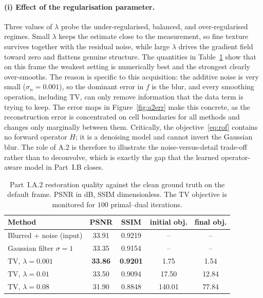 \documentclass[11pt,a4paper]{article}
\begin{document}
\paragraph{(i) Effect of the regularisation parameter.}
Three values of \(\lambda\) probe the under-regularised, balanced, and
over-regularised regimes. Small \(\lambda\) keeps the estimate close to the
measurement, so fine texture survives together with the residual noise, while
large \(\lambda\) drives the gradient field toward zero and flattens genuine
structure. The quantities in Table~\ref{tab:a2} show that on this frame the
weakest setting is numerically best and the strongest clearly over-smooths.
The reason is specific to this acquisition: the additive noise is very small
(\(\sigma_n=0.001\)), so the dominant error in \(f\) is the blur, and every
smoothing operation, including TV, can only remove information that the data
term is trying to keep. The error maps in Figure~\ref{fig:a2err} make this
concrete, as the reconstruction error is concentrated on cell boundaries for
all methods and changes only marginally between them. Critically, the
objective~\eqref{eq:rof} contains no forward operator \(H\); it is a denoising
model and cannot invert the Gaussian blur. The role of A.2 is therefore to
illustrate the noise-versus-detail trade-off rather than to deconvolve, which is
exactly the gap that the learned operator-aware model in Part~I.B closes.

\begin{table}[H]
  \centering
  \caption{Part~I.A.2 restoration quality against the clean ground truth on the
  default frame. PSNR in dB, SSIM dimensionless. The TV objective is monitored
  for \(100\) primal--dual iterations.}
  \label{tab:a2}
  \begin{tabular}{lcccc}
    \toprule
    Method & PSNR & SSIM & initial obj. & final obj. \\
    \midrule
    Blurred + noise (input)        & 33.91 & 0.9219 & --      & --      \\
    Gaussian filter \(\sigma=1\)   & 33.35 & 0.9154 & --      & --      \\
    TV, \(\lambda=0.001\)          & \textbf{33.86} & \textbf{0.9201} & 1.75   & 1.54    \\
    TV, \(\lambda=0.01\)           & 33.50 & 0.9094 & 17.50  & 12.84   \\
    TV, \(\lambda=0.08\)           & 31.90 & 0.8848 & 140.01 & 77.84   \\
    \bottomrule
  \end{tabular}
\end{table}
\end{document}
